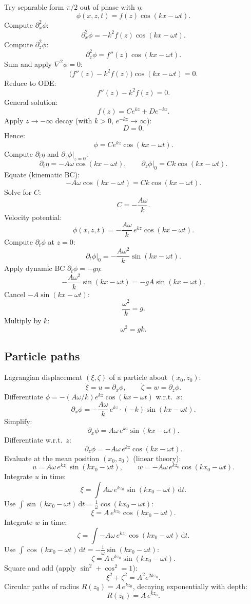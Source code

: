 \documentclass[11pt]{article}
\newcommand{\de}{\mathrm{d}}
\newcommand{\Lap}{\nabla^{2}}
\begin{document}
Try separable form $\pi/2$ out of phase with $\eta$:
\[ \phi(x,z,t)=f(z)\cos(kx-\omega t). \]
Compute $\partial_x^{2}\phi$:
\[ \partial_x^{2}\phi=-k^{2}f(z)\cos(kx-\omega t). \]
Compute $\partial_z^{2}\phi$:
\[ \partial_z^{2}\phi=f''(z)\cos(kx-\omega t). \]
Sum and apply $\Lap\phi=0$:
\[ \bigl(f''(z)-k^{2}f(z)\bigr)\cos(kx-\omega t)=0. \]
Reduce to ODE:
\[ f''(z)-k^{2}f(z)=0. \]
General solution:
\[ f(z)=Ce^{kz}+De^{-kz}. \]
Apply $z\to-\infty$ decay (with $k>0$, $e^{-kz}\to\infty$):
\[ D=0. \]
Hence:
\[ \phi=Ce^{kz}\cos(kx-\omega t). \]
Compute $\partial_t\eta$ and $\partial_z\phi|_{z=0}$:
\[ \partial_t\eta=-A\omega\cos(kx-\omega t),\qquad \partial_z\phi|_0=Ck\cos(kx-\omega t). \]
Equate (kinematic BC):
\[ -A\omega\cos(kx-\omega t)=Ck\cos(kx-\omega t). \]
Solve for $C$:
\[ C=-\frac{A\omega}{k}. \]
Velocity potential:
\begin{equation}
\boxed{\;\phi(x,z,t)=-\frac{A\omega}{k}\,e^{kz}\cos(kx-\omega t).\;}
\label{eq:phi-deep}
\end{equation}
Compute $\partial_t\phi$ at $z=0$:
\[ \partial_t\phi|_0=-\frac{A\omega^{2}}{k}\sin(kx-\omega t). \]
Apply dynamic BC $\partial_t\phi=-g\eta$:
\[ -\frac{A\omega^{2}}{k}\sin(kx-\omega t)=-gA\sin(kx-\omega t). \]
Cancel $-A\sin(kx-\omega t)$:
\[ \frac{\omega^{2}}{k}=g. \]
Multiply by $k$:
\begin{equation}
\boxed{\;\omega^{2}=gk.\;}
\label{eq:disp-deep}
\end{equation}

\subsection*{Particle paths}

Lagrangian displacement $(\xi,\zeta)$ of a particle about $(x_0,z_0)$:
\[ \dot\xi=u=\partial_x\phi,\qquad \dot\zeta=w=\partial_z\phi. \]
Differentiate $\phi=-(A\omega/k)e^{kz}\cos(kx-\omega t)$ w.r.t.\ $x$:
\[ \partial_x\phi=-\frac{A\omega}{k}\,e^{kz}\cdot(-k)\sin(kx-\omega t). \]
Simplify:
\[ \partial_x\phi=A\omega\,e^{kz}\sin(kx-\omega t). \]
Differentiate w.r.t.\ $z$:
\[ \partial_z\phi=-A\omega\,e^{kz}\cos(kx-\omega t). \]
Evaluate at the mean position $(x_0,z_0)$ (linear theory):
\[ u=A\omega\,e^{kz_0}\sin(kx_0-\omega t),\qquad w=-A\omega\,e^{kz_0}\cos(kx_0-\omega t). \]
Integrate $u$ in time:
\[ \xi=\int A\omega\,e^{kz_0}\sin(kx_0-\omega t)\,\de t. \]
Use $\int\sin(kx_0-\omega t)\,\de t=\tfrac{1}{\omega}\cos(kx_0-\omega t)$:
\[ \xi=A\,e^{kz_0}\cos(kx_0-\omega t). \]
Integrate $w$ in time:
\[ \zeta=\int -A\omega\,e^{kz_0}\cos(kx_0-\omega t)\,\de t. \]
Use $\int\cos(kx_0-\omega t)\,\de t=-\tfrac{1}{\omega}\sin(kx_0-\omega t)$:
\[ \zeta=A\,e^{kz_0}\sin(kx_0-\omega t). \]
Square and add (apply $\sin^{2}+\cos^{2}=1$):
\[ \xi^{2}+\zeta^{2}=A^{2}e^{2kz_0}. \]
Circular paths of radius $R(z_0)=A\,e^{kz_0}$, decaying exponentially with depth:
\[ \boxed{\;R(z_0)=A\,e^{kz_0}.\;} \]
\end{document}
